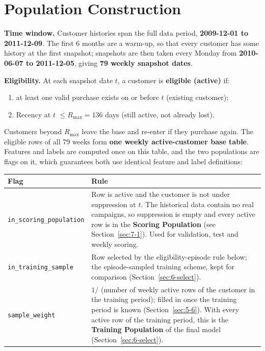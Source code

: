 \section{Population Construction}
\label{sec:5-3}

\textbf{Time window.} Customer histories span the full data period, \textbf{2009-12-01 to 2011-12-09}. The first 6 months are a warm-up, so that every customer has some history at the first snapshot; snapshots are then taken every Monday from \textbf{2010-06-07 to 2011-12-05}, giving \textbf{79 weekly snapshot dates}.

\textbf{Eligibility.} At each snapshot date $t$, a customer is \textbf{eligible (active)} if:
\begin{enumerate}
    \item at least one valid purchase exists on or before $t$ (existing customer);
    \item Recency at $t$ $\leq R_{\max} = 136$ days (still active, not already lost).
\end{enumerate}
Customers beyond $R_{\max}$ leave the base and re-enter if they purchase again. The eligible rows of all 79 weeks form \textbf{one weekly active-customer base table}. Features and labels are computed once on this table, and the two populations are flags on it, which guarantees both use identical feature and label definitions:

\begin{center}
\begin{tabular}{@{}p{4.6cm}p{9.5cm}@{}}
    \toprule
    Flag & Rule \\
    \midrule
    \texttt{in\_scoring\_population} & Row is active and the customer is not under suppression at $t$. The historical data contain no real campaigns, so suppression is empty and every active row is in the \textbf{Scoring Population} (see Section~\ref{sec:7-1}). Used for validation, test and weekly scoring. \\
    \texttt{in\_training\_sample} & Row selected by the eligibility-episode rule below; the episode-sampled training scheme, kept for comparison (Section~\ref{sec:6-select}). \\
    \texttt{sample\_weight} & $1 /$ (number of weekly active rows of the customer in the training period); filled in once the training period is known (Section~\ref{sec:5-6}). With every active row of the training period, this is the \textbf{Training Population} of the final model (Section~\ref{sec:6-select}). \\
    \bottomrule
\end{tabular}
\end{center}

